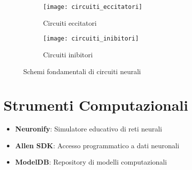 \documentclass[12pt]{article}
\begin{document}
\begin{figure}[h]
    \centering
    \begin{subfigure}{0.45\textwidth}
        \centering
        \texttt{[image: circuiti\_eccitatori]}
        \caption{Circuiti eccitatori}
    \end{subfigure}
    \hfill
    \begin{subfigure}{0.45\textwidth}
        \centering
        \texttt{[image: circuiti\_inibitori]}
        \caption{Circuiti inibitori}
    \end{subfigure}
    \caption{Schemi fondamentali di circuiti neurali}
\end{figure}

\section{Strumenti Computazionali}
\begin{itemize}
    \item \textbf{Neuronify}: Simulatore educativo di reti neurali
    \item \textbf{Allen SDK}: Accesso programmatico a dati neuronali
    \item \textbf{ModelDB}: Repository di modelli computazionali
\end{itemize}
\end{document}
